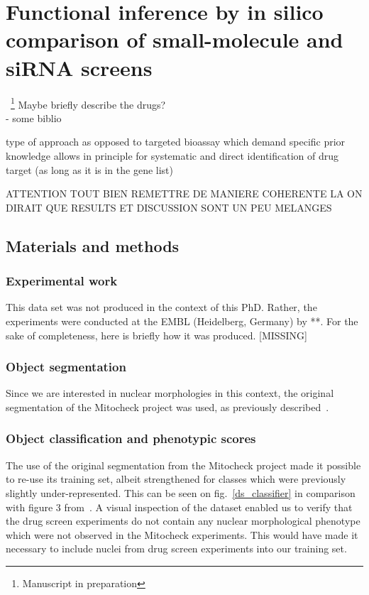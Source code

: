 \section{Functional inference by in silico comparison of small-molecule and siRNA screens}
~\footnote{Manuscript in preparation}
Maybe briefly describe the drugs?\\
- some biblio ~\cite{pmid20418956}

type of approach as opposed to targeted bioassay which demand specific prior knowledge allows in principle for systematic and direct identification of drug target (as long as it is in the gene list)

ATTENTION TOUT BIEN REMETTRE DE MANIERE COHERENTE LA ON DIRAIT QUE RESULTS ET DISCUSSION SONT UN PEU MELANGES

\subsection{Materials and methods}
\subsubsection{Experimental work}
This data set was not produced in the context of this PhD. Rather, the experiments were conducted at the EMBL (Heidelberg, Germany) by **. For the sake of completeness, here is briefly how it was produced. [MISSING]
\subsubsection{Object segmentation}
\label{sec:ds_seg}
Since we are interested in nuclear morphologies in this context, the original segmentation of the Mitocheck project was used, as previously described~\cite{Walter2010}.

\subsubsection{Object classification and phenotypic scores}
\label{sec:ps}
The use of the original segmentation from the Mitocheck project made it possible to re-use its training set, albeit strengthened for classes which were previously slightly under-represented. This can be seen on fig.~\ref{ds_classifier} in comparison with figure 3 from~\cite{Walter2010}. A visual inspection of the dataset enabled us to verify that the drug screen experiments do not contain any nuclear morphological phenotype which were not observed in the Mitocheck experiments. This would have made it necessary to include nuclei from drug screen experiments into our training set.

